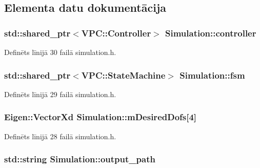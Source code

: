 \subsection{Elementa datu dokumentācija}
\subsubsection[{\texorpdfstring{controller}{controller}}]{\setlength{\rightskip}{0pt plus 5cm}std\+::shared\+\_\+ptr$<${\bf V\+P\+C\+::\+Controller}$>$ Simulation\+::controller}\hypertarget{class_simulation_a2e3cc7be178e163d8a2bae06191993a7}{}\label{class_simulation_a2e3cc7be178e163d8a2bae06191993a7}


Definēts līnijā 30 failā simulation.\+h.

\subsubsection[{\texorpdfstring{fsm}{fsm}}]{\setlength{\rightskip}{0pt plus 5cm}std\+::shared\+\_\+ptr$<${\bf V\+P\+C\+::\+State\+Machine}$>$ Simulation\+::fsm}\hypertarget{class_simulation_a3a7d01e2a53a88044001a28aab387a97}{}\label{class_simulation_a3a7d01e2a53a88044001a28aab387a97}


Definēts līnijā 29 failā simulation.\+h.

\subsubsection[{\texorpdfstring{m\+Desired\+Dofs}{mDesiredDofs}}]{\setlength{\rightskip}{0pt plus 5cm}Eigen\+::\+Vector\+Xd Simulation\+::m\+Desired\+Dofs\mbox{[}4\mbox{]}}\hypertarget{class_simulation_a3c630148d41a6eb21d13563e2017f7b6}{}\label{class_simulation_a3c630148d41a6eb21d13563e2017f7b6}


Definēts līnijā 28 failā simulation.\+h.

\subsubsection[{\texorpdfstring{output\+\_\+path}{output_path}}]{\setlength{\rightskip}{0pt plus 5cm}std\+::string Simulation\+::output\+\_\+path}\hypertarget{class_simulation_a7c51cfbcfc8f08e47535a504dfbdd18a}{}\label{class_simulation_a7c51cfbcfc8f08e47535a504dfbdd18a}



